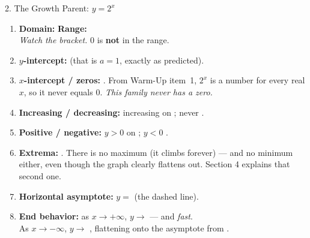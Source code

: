 \documentclass[10pt]{article}
\begin{document}
\begin{notesbox}{2. The Growth Parent: $y=2^{x}$}
\vspace{2pt}
\begin{enumerate}[leftmargin=1.7em, itemsep=3pt]
  \item \textbf{Domain:} \ans{$(-\infty,\infty)$} \quad \textbf{Range:}  \\
        \emph{Watch the bracket.} $0$ is \textbf{not} in the range.
  \item \textbf{$y$-intercept:}  \quad (that is $a=1$, exactly as predicted).
  \item \textbf{$x$-intercept / zeros:} . \; From Warm-Up item~1, $2^{x}$ is a
         number for every real $x$, so it never equals $0$. \emph{This family never
        has a zero.}
  \item \textbf{Increasing / decreasing:} increasing on \ans{$(-\infty,\infty)$}; never
        .
  \item \textbf{Positive / negative:} $y>0$ on \ans{$(-\infty,\infty)$}; \quad $y<0$
        .
  \item \textbf{Extrema:} . There is no maximum (it climbs forever) --- and no minimum
        either, even though the graph clearly flattens out. Section 4 explains that second one.
  \item \textbf{Horizontal asymptote:} $y=$  \quad (the dashed line).
  \item \textbf{End behavior:} as $x\to+\infty$, $y\to$ \ans{$+\infty$} --- and \emph{fast}. \\
        As $x\to-\infty$, $y\to$ , flattening onto the asymptote from
        .
\end{enumerate}
\end{notesbox}
\end{document}
